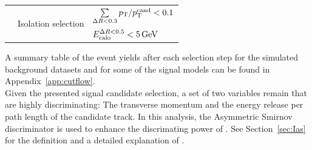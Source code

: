 \begin{table}[!h]
{\begin{tabular}{l|l|l}
                                                              &  \multirow{2}{*}{Isolation selection}      & $\sum \limits_{\Delta R < 0.3} p_{\text{T}}/p_{\text{T}}^{\text{cand}} < 0.1$ \\
                                                              &                                            & $E^{\Delta R<0.5}_{\text{calo}}<5\,\text{Ge}\kern-0.06667em\text{V}$ \\


\bottomrule
\end{tabular}}
\end{table}  
A summary table of the event yields after each selection step for the simulated background datasets and for some of the signal models can be found in Appendix~\ref{app:cutflow}.\\


Given the presented signal candidate selection, a set of two variables remain  that are highly discriminating:
The transverse momentum \pt and the energy release per path length \dedx of the candidate track.
In this analysis, the Asymmetric Smirnov discriminator \ias is used to enhance the discrimating power of \dedx.
See Section~\ref{sec:Ias} for the definition and a detailed explanation of \ias.

